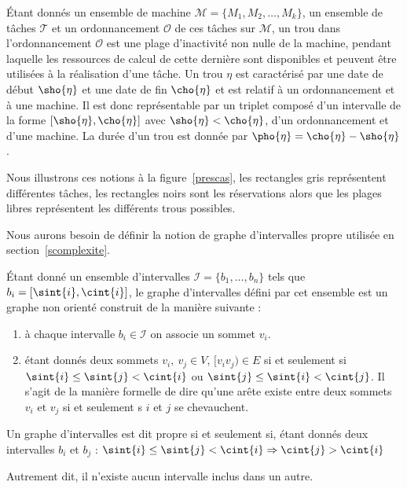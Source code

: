 \begin{ndf}[Trou]
    Étant donnés un ensemble de machine $\mathcal{M} = \{M_1, M_2, \dots, M_k\}$, un ensemble de
    tâches $\mathcal{T}$ et un ordonnancement $\mathcal{O}$ de ces tâches sur $\mathcal{M}$, un trou
    dans l'ordonnancement $\mathcal{O}$ est une plage d'inactivité non nulle de la machine, pendant
    laquelle les ressources de calcul de cette dernière sont disponibles et peuvent être utilisées à
    la réalisation d'une tâche. Un trou $\eta$ est caractérisé par une date de début $\sho{\eta}$ et
    une date de fin $\cho{\eta}$ et est relatif à un ordonnancement et à une machine. Il est donc
    représentable par un triplet composé d'un intervalle de la forme $[\sho{\eta}, \cho{\eta}]$ avec
    $\sho{\eta} < \cho{\eta}$, d'un ordonnancement et d'une machine. La durée d'un trou est donnée
    par $\pho{\eta} = \cho{\eta} - \sho{\eta}$.
\end{ndf}

Nous illustrons ces notions à la figure~\ref{prescas}, les rectangles gris
représentent différentes tâches, les rectangles noirs sont les réservations alors que les plages
libres représentent les différents trous possibles.

Nous aurons besoin de définir la notion de graphe d'intervalles propre utilisée en
section~\ref{scomplexite}.

\begin{ndf}
    Étant donné un ensemble d'intervalles $\mathcal{I} = \{b_1, \dots, b_n\}$ tels que $b_i = [\sint{i},
    \cint{i}]$, le graphe d'intervalles défini par cet ensemble est un graphe non orienté construit de la
    manière suivante :
    \begin{enumerate}
        \item à chaque intervalle $b_i \in \mathcal{I}$ on associe un sommet $v_i$.
        \item étant donnés deux sommets $v_i,\ v_j \in V$, $[v_iv_j) \in E$ si et seulement si 
            $\sint{i} \leq \sint{j} < \cint{i}$ ou $\sint{j} \leq \sint{i} < \cint{j}$. Il s'agit
            de la manière formelle de dire qu'une arête existe entre deux sommets $v_i$ et $v_j$ si
            et seulement s $i$ et $j$ se chevauchent.
    \end{enumerate}

    Un graphe d'intervalles est dit propre si et seulement si, étant donnés deux intervalles $b_i$
    et $b_j$ : $\sint{i} \leq \sint{j} < \cint{i} \Rightarrow \cint{j} > \cint{i}$

    Autrement dit, il n'existe aucun intervalle inclus dans un autre.
\end{ndf}

